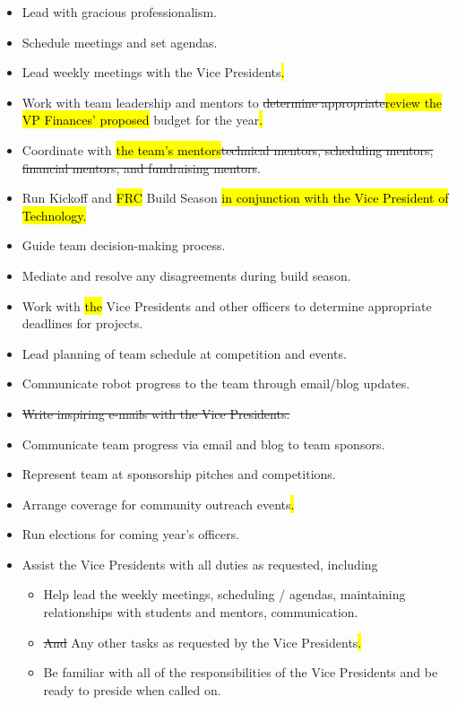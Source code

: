 \documentclass[12pt, a4paper]{article}
\begin{document}
\begin{itemize}
\item Lead with gracious professionalism.
\item Schedule meetings and set agendas.
\item Lead weekly meetings with the Vice Presidents\hl{.}
\item Work with team leadership and mentors to \st{determine appropriate}\hl{review the VP Finances' proposed} budget for the year\hl{.}
\item Coordinate with \hl{the team's mentors}\st{technical mentors, scheduling mentors, financial mentors, and fundraising mentors}.
\item Run Kickoff and \hl{FRC }Build Season\hl{ in conjunction with the Vice President of Technology.}
\item Guide team decision-making process.
\item Mediate and resolve any disagreements during build season.
\item Work with \hl{the} Vice Presidents and other officers to determine appropriate deadlines for projects.
\item Lead planning of team schedule at competition and events.
\item Communicate robot progress to the team through email/blog updates.
\item \st{Write inspiring e-mails with the Vice Presidents.}
\item Communicate team progress via email and blog to team sponsors.
\item Represent team at sponsorship pitches and competitions.
\item Arrange coverage for community outreach events\hl{.}
\item Run elections for coming year’s officers.  
\item Assist the Vice Presidents with all duties as requested, including
	\begin{itemize}
		\item Help lead the weekly meetings, scheduling / agendas, maintaining relationships with students and mentors, communication.
		\item \st{And} Any other tasks as requested by the Vice Presidents\hl{.}
		\item Be familiar with all of the responsibilities of the Vice Presidents and be ready to preside when called on.
	\end{itemize}
\end{itemize}
\end{document}
